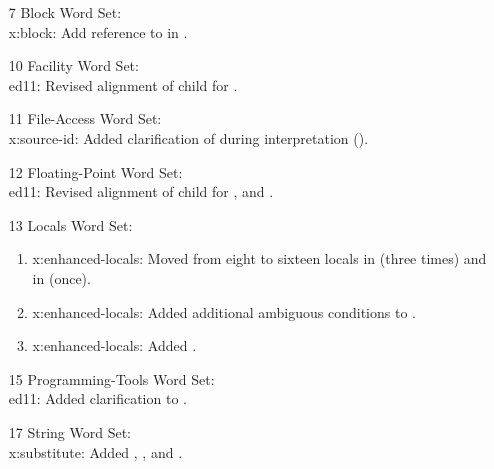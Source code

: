 \begin{itemize}
	\item[7] Block Word Set: \\					%
		\textsf{x:block}: Add reference to  in .

	\item[10] Facility Word Set: \\				%
		\textsf{ed11}: Revised alignment of child for .

	\item[11] File-Access Word Set: \\			%
		\textsf{x:source-id}: Added clarification of  during interpretation ().

	\item[12] Floating-Point Word Set: \\		%
		\textsf{ed11}: Revised alignment of child for
			,
			 and
			.

	\item[13] Locals Word Set:						%
		\begin{enumerate}
		\item \textsf{x:enhanced-locals}:
			Moved from eight to sixteen locals in
			 (three times)
			and in  (once).
		\item \textsf{x:enhanced-locals}:
			Added additional ambiguous conditions to
			.
		\item \textsf{x:enhanced-locals}:
			Added .
		\end{enumerate}

	\item[15] Programming-Tools Word Set: \\	%
		\textsf{ed11}: Added clarification to .

	\item[17] String Word Set: \\					%
		\textsf{x:substitute}:
			Added ,
			,
			 and
			.


\end{itemize}
